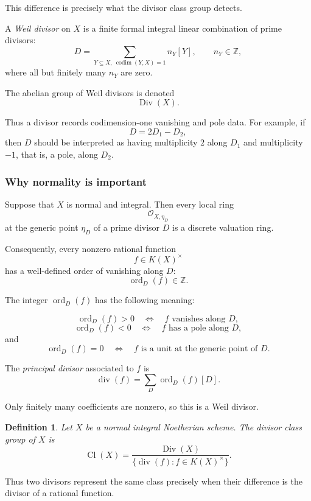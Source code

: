 \documentclass[12pt,a4paper]{article}
\newcommand{\OO}{\mathcal{O}}
\newcommand{\divisor}{\operatorname{div}}
\newcommand{\Z}{\mathbb{Z}}
\newcommand{\Cl}{\operatorname{Cl}}
\theoremstyle{notespace}
\newtheorem{definition}{Definition}[subsection]
\begin{document}
This difference is precisely what the divisor class group detects.

A \emph{Weil divisor} on \(X\) is a finite formal integral linear combination of prime divisors:
\[
D=\sum_{Y\subseteq X,\ \operatorname{codim}(Y,X)=1} n_Y[Y],
\qquad
n_Y\in \Z,
\]
where all but finitely many \(n_Y\) are zero.

The abelian group of Weil divisors is denoted
\[
\operatorname{Div}(X).
\]

Thus a divisor records codimension-one vanishing and pole data. For example, if
\[
D=2D_1-D_2,
\]
then \(D\) should be interpreted as having multiplicity \(2\) along \(D_1\) and multiplicity \(-1\), that is, a pole, along \(D_2\).

\subsubsection{Why normality is important}

Suppose that \(X\) is normal and integral. Then every local ring
\[
\OO_{X,\eta_D}
\]
at the generic point \(\eta_D\) of a prime divisor \(D\) is a discrete valuation ring.

Consequently, every nonzero rational function
\[
f\in K(X)^\times
\]
has a well-defined order of vanishing along \(D\):
\[
\operatorname{ord}_D(f)\in \Z.
\]

The integer \(\operatorname{ord}_D(f)\) has the following meaning:

\[
\operatorname{ord}_D(f)>0
\quad\Longleftrightarrow\quad
f\text{ vanishes along }D,
\]
\[
\operatorname{ord}_D(f)<0
\quad\Longleftrightarrow\quad
f\text{ has a pole along }D,
\]
and
\[
\operatorname{ord}_D(f)=0
\quad\Longleftrightarrow\quad
f\text{ is a unit at the generic point of }D.
\]

The \emph{principal divisor} associated to \(f\) is
\[
\divisor(f)
=
\sum_D \operatorname{ord}_D(f)[D].
\]

Only finitely many coefficients are nonzero, so this is a Weil divisor.

\begin{definition}
	Let \(X\) be a normal integral Noetherian scheme. The \emph{divisor class group} of \(X\) is
	\[
	\Cl(X)
	=
	\frac{\operatorname{Div}(X)}
	{\{\divisor(f):f\in K(X)^\times\}}.
	\]
\end{definition}

Thus two divisors represent the same class precisely when their difference is the divisor of a rational function.
\end{document}
